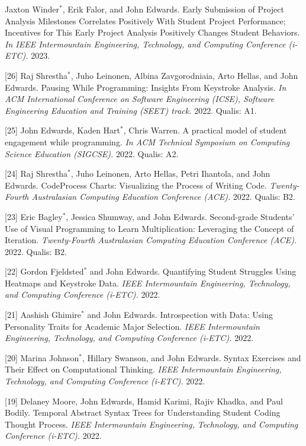 \documentclass[margin,line]{res}
\newcommand{\cnum}[1]{[#1]}
\begin{document}
\begin{resume}
\cnum{27} Jaxton Winder$^*$, Erik Falor, and John Edwards. Early Submission of Project Analysis Milestones Correlates Positively With Student Project Performance; Incentives for This Early Project Analysis Positively Changes Student Behaviors. \textit{In IEEE Intermountain Engineering, Technology, and Computing Conference (i-ETC).} 2023.

\cnum{26} Raj Shrestha$^*$, Juho Leinonen, Albina Zavgorodniaia, Arto Hellas, and John Edwards. Pausing While Programming: Insights From Keystroke Analysis. \textit{In ACM International Conference on Software Engineering (ICSE), Software Engineering Education and Training (SEET) track.} 2022. Qualis: A1.

\cnum{25} John Edwards, Kaden Hart$^*$, Chris Warren. A practical model of student engagement while programming. \textit{In ACM Technical Symposium on Computing Science Education (SIGCSE).} 2022. Qualis: A2.

\cnum{24} Raj Shrestha$^*$, Juho Leinonen, Arto Hellas, Petri Ihantola, and John Edwards. CodeProcess Charts: Visualizing the Process of Writing Code. \textit{Twenty-Fourth Australasian Computing Education Conference (ACE).} 2022. Qualis: B2.

\cnum{23} Eric Bagley$^*$, Jessica Shumway, and John Edwards. Second-grade Students' Use of Visual Programming to Learn Multiplication: Leveraging the Concept of Iteration. \textit{Twenty-Fourth Australasian Computing Education Conference (ACE).} 2022. Qualis: B2.

\cnum{22} Gordon Fjeldsted$^*$ and John Edwards. Quantifying Student Struggles Using Heatmaps and Keystroke Data. \textit{IEEE Intermountain Engineering, Technology, and Computing Conference (i-ETC).} 2022.

\cnum{21} Aashish Ghimire$^*$ and John Edwards. Introspection with Data: Using Personality Traits for Academic Major Selection. \textit{IEEE Intermountain Engineering, Technology, and Computing Conference (i-ETC).} 2022.

\cnum{20} Marina Johnson$^*$, Hillary Swanson, and John Edwards. Syntax Exercises and Their Effect on Computational Thinking. \textit{IEEE Intermountain Engineering, Technology, and Computing Conference (i-ETC).} 2022.

\cnum{19} Delaney Moore, John Edwards, Hamid Karimi, Rajiv Khadka, and Paul Bodily. Temporal Abstract Syntax Trees for Understanding Student Coding Thought Process. \textit{IEEE Intermountain Engineering, Technology, and Computing Conference (i-ETC).} 2022.


\end{resume}
\end{document}
